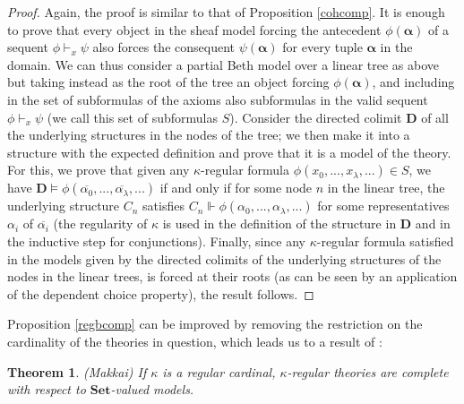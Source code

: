 \documentclass[a4paper,11pt]{article}
\theoremstyle{plain}
\newtheorem{thm}{Theorem}[subsection]
\theoremstyle{plain}
\theoremstyle{remark}
\newcommand{\Sets}{\ensuremath{\mathbf{Set}}}
\begin{document}
\begin{proof} 
Again, the proof is similar to that of Proposition \ref{cohcomp}. It is enough to prove that every object in the sheaf model forcing the antecedent $\phi(\boldsymbol{\alpha})$ of a sequent $\phi \vdash_x \psi$ also forces the consequent $\psi(\boldsymbol{\alpha})$ for every tuple $\boldsymbol{\alpha}$ in the domain. We can thus consider a partial Beth model over a linear tree as above but taking instead as the root of the tree an object forcing $\phi(\boldsymbol{\alpha})$, and including in the set of subformulas of the axioms also subformulas in the valid sequent $\phi \vdash_x \psi$ (we call this set of subformulas $S$). Consider the directed colimit $\mathbf{D}$ of all the underlying structures in the nodes of the tree; we then make it into a structure with the expected definition and prove that it is a model of the theory. For this, we prove that given any $\kappa$-regular formula $\phi(x_0, ..., x_{\lambda}, ...) \in S$, we have $\mathbf{D} \vDash \phi(\overline{\alpha_0}, ..., \overline{\alpha_{\lambda}}, ...)$ if and only if for some node $n$ in the linear tree, the underlying structure $C_n$ satisfies $C_n \Vdash \phi(\alpha_0, ..., \alpha_{\lambda}, ...)$ for some representatives $\alpha_i$ of $\overline{\alpha_i}$ (the regularity of $\kappa$ is used in the definition of the structure in $\mathbf{D}$ and in the inductive step for conjunctions). Finally, since any $\kappa$-regular formula satisfied in the models given by the directed colimits of the underlying structures of the nodes in the linear trees, is forced at their roots (as can be seen by an application of the dependent choice property), the result follows. 
\end{proof}

Proposition \ref{regbcomp} can be improved by removing the restriction on the cardinality of the theories in question, which leads us to a result of \cite{makkai}:

\begin{thm}\label{sregbcomp}
(Makkai) If $\kappa$ is a regular cardinal, $\kappa$-regular theories are complete with respect to \Sets-valued models.
\end{thm}
\end{document}

